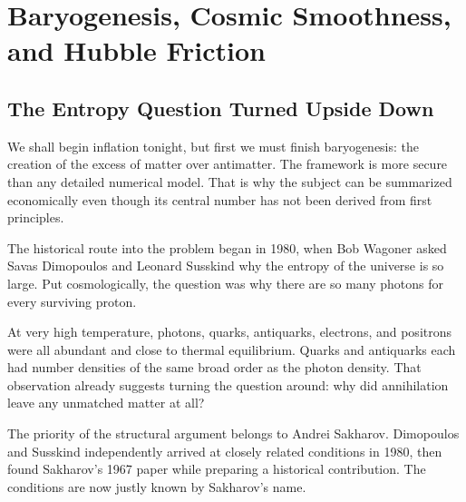 \chapter{Baryogenesis, Cosmic Smoothness, and Hubble Friction}


\section{The Entropy Question Turned Upside Down}

We shall begin inflation tonight, but first we must finish baryogenesis: the creation of the excess of matter over antimatter. The framework is more secure than any detailed numerical model. That is why the subject can be summarized economically even though its central number has not been derived from first principles.

The historical route into the problem began in 1980, when Bob Wagoner asked Savas Dimopoulos and Leonard Susskind why the entropy of the universe is so large. Put cosmologically, the question was why there are so many photons for every surviving proton.

At very high temperature, photons, quarks, antiquarks, electrons, and positrons were all abundant and close to thermal equilibrium. Quarks and antiquarks each had number densities of the same broad order as the photon density. That observation already suggests turning the question around: why did annihilation leave any unmatched matter at all?

The priority of the structural argument belongs to Andrei Sakharov. Dimopoulos and Susskind independently arrived at closely related conditions in 1980, then found Sakharov's 1967 paper while preparing a historical contribution. The conditions are now justly known by Sakharov's name.

